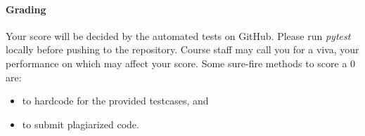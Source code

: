 \documentclass[a4paper]{exam}
\begin{document}
\begin{questions}
  \paragraph{Grading} Your score will be decided by the automated tests on GitHub. Please run \textit{pytest} locally before pushing to the repository. Course staff may call you for a viva, your performance on which may affect your score. Some sure-fire methods to score a 0 are:
  \begin{itemize}
    \item to hardcode for the provided testcases, and
    \item to submit plagiarized code.
  \end{itemize}

  \begin{solution}
  \end{solution}
\end{questions}
\end{document}
